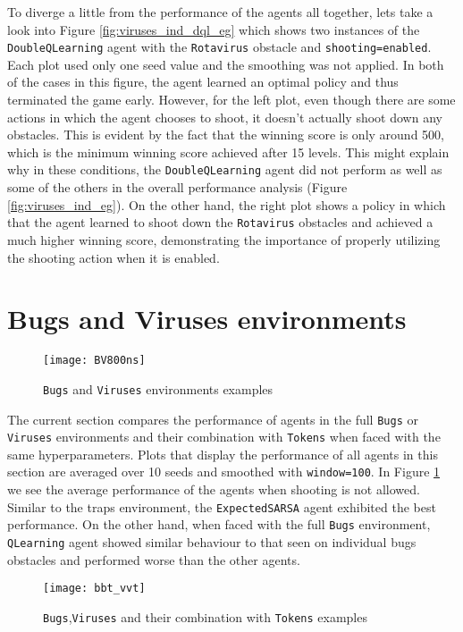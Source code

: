 To diverge a little from the performance of the agents all together, lets take a look into Figure \ref{fig:viruses_ind_dql_eg} which shows two instances of the \texttt{DoubleQLearning} agent with the \texttt{Rotavirus} obstacle and \texttt{shooting=enabled}. Each plot used only one seed value and the smoothing was not applied. In both of the cases in this figure, the agent learned an optimal policy and thus terminated the game early. However, for the left plot, even though there are some actions in which the agent chooses to shoot, it doesn't actually shoot down any obstacles. This is evident by the fact that the winning score is only around 500, which is the minimum winning score achieved after 15 levels.  This might explain why in these conditions, the \texttt{DoubleQLearning} agent did not perform as well as some of the others in the overall performance analysis (Figure \ref{fig:viruses_ind_eg}). On the other hand, the right plot shows a policy in which that the agent learned to shoot down the \texttt{Rotavirus} obstacles and achieved a much higher winning score, demonstrating the importance of properly utilizing the shooting action when it is enabled.

\section{Bugs and Viruses environments}
\begin{figure}[h]
    \centering
    \texttt{[image: BV800ns]}
    \caption{\texttt{Bugs} and \texttt{Viruses} environments examples}
    \label{fig:bv800ns_eg}
\end{figure}

The current section compares the performance of agents in the full \texttt{Bugs} or \texttt{Viruses} environments and their combination with \texttt{Tokens} when faced with the same hyperparameters. Plots that display the performance of all agents in this section are averaged over 10 seeds and smoothed with \texttt{window=100}. In Figure \ref{fig:bv800ns_eg} we see the average performance of the agents when shooting is not allowed. Similar to the traps environment, the \texttt{ExpectedSARSA} agent exhibited the best performance. On the other hand, when faced with the full \texttt{Bugs} environment, \texttt{QLearning} agent showed similar behaviour to that seen on individual bugs obstacles and performed worse than the other agents.

\begin{figure}[h]
    \centering
    \texttt{[image: bbt\_vvt]}
    \caption{\texttt{Bugs},\texttt{Viruses} and their combination with \texttt{Tokens} examples}
    \label{fig:bbt_vvt_eg}
\end{figure}

